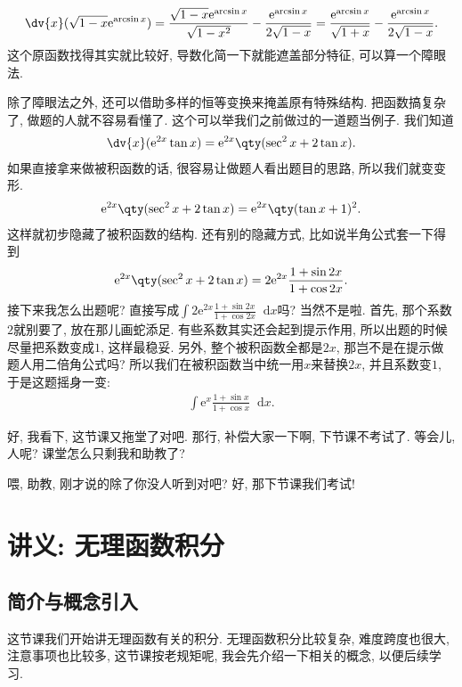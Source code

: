 \documentclass{ctexbook}
\newcommand{\e}{\mathrm{e}}
\newcommand*{\dif}{\mathop{}\!\mathrm{d}}
\begin{document}
{\begin{align*}
\dv{x}(\sqrt{1-x}\e^{\arcsin{x}})=\frac{\sqrt{1-x}\e^{\arcsin{x}}}{\sqrt{1-x^{2}}}-\frac{\e^{\arcsin{x}}}{2\sqrt{1-x}}=\frac{\e^{\arcsin{x}}}{\sqrt{1+x}}-\frac{\e^{\arcsin{x}}}{2\sqrt{1-x}}
.\end{align*}
这个原函数找得其实就比较好, 导数化简一下就能遮盖部分特征, 可以算一个障眼法. \par
除了障眼法之外, 还可以借助多样的恒等变换来掩盖原有特殊结构. 把函数搞复杂了, 做题的人就不容易看懂了. 这个可以举我们之前做过的一道题当例子. 我们知道
\begin{align*}
\dv{x}(\e^{2x}\tan{x})=\e^{2x}\qty(\sec^{2}{x}+2\tan{x})
.\end{align*}
如果直接拿来做被积函数的话, 很容易让做题人看出题目的思路, 所以我们就变变形. 
\begin{align*}
\e^{2x}\qty(\sec^{2}{x}+2\tan{x})=\e^{2x}\qty(\tan{x}+1)^{2}
.\end{align*}
这样就初步隐藏了被积函数的结构. 还有别的隐藏方式, 比如说半角公式套一下得到
\begin{align*}
\e^{2x}\qty(\sec^{2}{x}+2\tan{x})=2\e^{2x}\frac{1+\sin{2x}}{1+\cos{2x}}
.\end{align*}
接下来我怎么出题呢? 直接写成$\int2\e^{2x}\frac{1+\sin{2x}}{1+\cos{2x}}\dif{x}$吗? 当然不是啦. 首先, 那个系数$2$就别要了, 放在那儿画蛇添足. 有些系数其实还会起到提示作用, 所以出题的时候尽量把系数变成$1$, 这样最稳妥. 另外, 整个被积函数全都是$2x$, 那岂不是在提示做题人用二倍角公式吗? 所以我们在被积函数当中统一用$x$来替换$2x$, 并且系数变$1$, 于是这题摇身一变: 
\begin{align*}
\int\e^{x}\frac{1+\sin{x}}{1+\cos{x}}\dif{x}
.\end{align*}\par
好, 我看下, 这节课又拖堂了对吧. 那行, 补偿大家一下啊, 下节课不考试了. 等会儿, 人呢? 课堂怎么只剩我和助教了? \par
喂, 助教, 刚才说的除了你没人听到对吧? 好, 那下节课我们考试! \par
\chapter{讲义: 无理函数积分}
\section{简介与概念引入}
这节课我们开始讲无理函数有关的积分. 无理函数积分比较复杂, 难度跨度也很大, 注意事项也比较多, 这节课按老规矩呢, 我会先介绍一下相关的概念, 以便后续学习. \par
}
\end{document}
